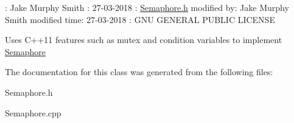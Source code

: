 \+: Jake Murphy Smith \+: 27-\/03-\/2018 \+: \hyperlink{Semaphore_8h_source}{Semaphore.\+h}  modified by\+: Jake Murphy Smith  modified time\+: 27-\/03-\/2018 \+: G\+NU G\+E\+N\+E\+R\+AL P\+U\+B\+L\+IC L\+I\+C\+E\+N\+SE

Uses C++11 features such as mutex and condition variables to implement \hyperlink{classSemaphore}{Semaphore} 

The documentation for this class was generated from the following files\+:\begin{DoxyCompactItemize}
\item 
Semaphore.\+h\item 
Semaphore.\+cpp\end{DoxyCompactItemize}
